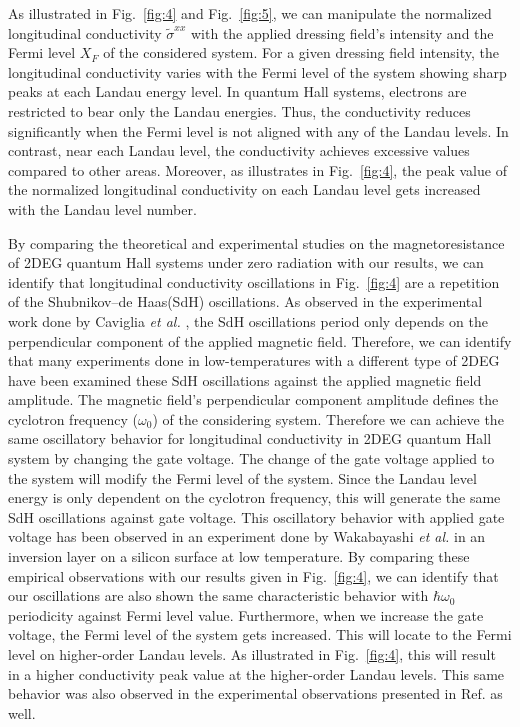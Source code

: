 \documentclass[
 reprint,
 amsmath,amssymb,
 aps,
 prb,
]{revtex4-2}
\begin{document}
As illustrated in Fig.~\ref{fig:4} and Fig.~\ref{fig:5}, we can manipulate the normalized longitudinal conductivity $\widetilde{\sigma}^{xx}$ with the applied dressing field's intensity and the Fermi level $X_F$ of the considered system.
For a given dressing field intensity, the longitudinal conductivity varies with  the Fermi level of the system showing sharp peaks at each Landau energy level.
In quantum Hall systems, electrons are restricted to bear only the Landau energies. Thus, the conductivity reduces significantly when the Fermi level is not aligned with any of the Landau levels. In contrast, near each Landau level, the conductivity achieves excessive values compared to other areas. Moreover, as illustrates in Fig.~\ref{fig:4}, the peak value of the normalized longitudinal conductivity on each Landau level gets increased with the Landau level number.

{\color{Red}
By comparing the theoretical \cite{ando72,ando74_1,ando74_2,ando74_3,ando74_4,ando82,endo09} and experimental \cite{endo09,wakabayashi78,ochiai190,mancoff96,arapov02,grbic04,caviglia10} studies on the magnetoresistance of 2DEG quantum Hall systems under zero radiation with our results, we can identify that longitudinal conductivity oscillations in Fig.~\ref{fig:4} are a repetition of the Shubnikov–de Haas(SdH) oscillations.
As observed in the experimental work done by Caviglia \textit{et al.} \cite{caviglia10}, the SdH oscillations period only depends on the perpendicular component of the applied magnetic field.
Therefore, we can identify that many experiments done in low-temperatures \cite{endo09,ochiai190,mancoff96,arapov02,grbic04,caviglia10} with a different type of 2DEG have been examined these SdH oscillations against the applied magnetic field amplitude.
The magnetic field's perpendicular component amplitude defines the cyclotron frequency ($\omega_0$) of the considering system.
Therefore we can achieve the same oscillatory behavior for longitudinal conductivity in 2DEG quantum Hall system by changing the gate voltage. The  change of the gate voltage applied to the system will modify the Fermi level of the system.
Since the Landau level energy is only dependent on the cyclotron frequency, this will generate the same SdH oscillations against gate voltage.
This oscillatory behavior with applied gate voltage has been observed in an  experiment done by Wakabayashi \textit{et al.} \cite{wakabayashi78} in an inversion layer on a silicon surface at low temperature. By comparing these empirical observations with our results given in Fig.~\ref{fig:4}, we can identify that our oscillations are also shown the same characteristic behavior with $\hbar\omega_0$ periodicity against Fermi level value. Furthermore, when we increase the gate voltage, the Fermi level of the system gets increased. This will locate to the Fermi level on higher-order Landau levels. As illustrated in Fig.~\ref{fig:4}, this will result in a higher conductivity peak value at the higher-order Landau levels. This same behavior was also observed in the experimental observations presented in Ref. \cite{wakabayashi78} as well.}
\end{document}
